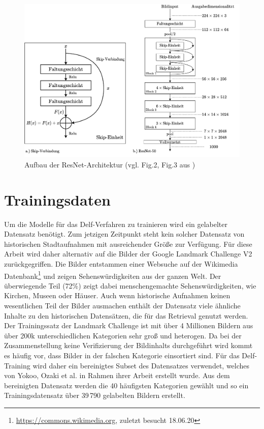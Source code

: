 \begin{figure}
\includegraphics[scale=0.70]{resnet-50.pdf}
\caption{Aufbau der ResNet-Architektur (vgl. Fig.2, Fig.3 aus \cite{resnet})}
\label{resnet}
\end{figure}

\section{Trainingsdaten}
Um die Modelle für das Delf-Verfahren zu trainieren wird ein gelabelter Datensatz benötigt. Zum jetzigen Zeitpunkt steht kein solcher Datensatz von historischen Stadtaufnahmen mit ausreichender Größe zur Verfügung. Für diese Arbeit wird daher alternativ auf die Bilder der Google Landmark Challenge V2 \cite{landmarks_v2} zurückgegriffen. Die Bilder entstammen einer Websuche auf der Wikimedia Datenbank\footnote[1]{\url{https://commons.wikimedia.org}, zuletzt besucht 18.06.20} und zeigen Sehenswürdigkeiten aus der ganzen Welt. Der überwiegende Teil (72\%) zeigt dabei menschengemachte Sehenswürdigkeiten, wie Kirchen, Museen oder Häuser. Auch wenn historische Aufnahmen keinen wesentlichen Teil der Bilder ausmachen enthält der Datensatz viele ähnliche Inhalte zu den historischen Datensätzen, die für das Retrieval genutzt werden. Der Trainingssatz der Landmark Challenge ist mit über 4 Millionen Bildern aus über 200k unterschiedlichen Kategorien sehr groß und heterogen. Da bei der Zusammenstellung keine Verifizierung der Bildinhalts durchgeführt wird kommt es häufig vor, dass Bilder in der falschen Kategorie einsortiert sind. Für das Delf-Training wird daher ein bereinigtes Subset des Datensatzes verwendet, welches von Yokoo, Ozaki et al. in Rahmen ihrer Arbeit \cite{landmarks_verified} erstellt wurde. Aus dem bereinigten Datensatz werden die 40 häufigsten Kategorien gewählt und so ein Trainingsdatensatz über 39\,790 gelabelten Bildern erstellt. 

